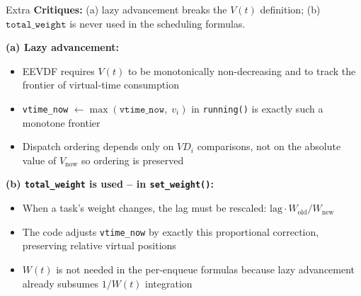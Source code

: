 \documentclass[aspectratio=169]{beamer}
\begin{document}
\begin{frame}{Extra}
       \textbf{Critiques:} (a) lazy advancement breaks the $V(t)$ definition;
        (b) $\texttt{total\_weight}$ is never used in the scheduling formulas.

        \vspace{0.25cm}
        \textbf{(a) Lazy advancement:}
        \begin{itemize}
                \item EEVDF requires $V(t)$ to be monotonically non-decreasing
                        and to track the frontier of virtual-time consumption
                \item \texttt{vtime\_now} $\leftarrow \max(\texttt{vtime\_now},\; v_i)$
                        in \texttt{running()} is exactly such a monotone frontier
                \item Dispatch ordering depends only on $VD_i$ comparisons,
                        not on the absolute value of $V_{\mathrm{now}}$ so
                        ordering is preserved
        \end{itemize}

        \vspace{0.15cm}
        \textbf{(b) \texttt{total\_weight} is used -- in \texttt{set\_weight()}:}
        \begin{itemize}
                \item When a task's weight changes, the lag must be
                        rescaled: $\mathrm{lag} \cdot W_{\mathrm{old}} / W_{\mathrm{new}}$
                \item The code adjusts \texttt{vtime\_now} by exactly this
                        proportional correction, preserving relative virtual positions
                \item $W(t)$ is not needed in the per-enqueue formulas because
                        lazy advancement already subsumes $1/W(t)$ integration
        \end{itemize}
\end{frame}
\addtocounter{framenumber}{-1}
\end{document}
